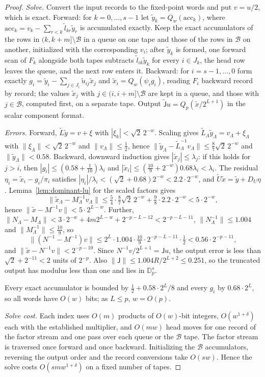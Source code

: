 \begin{proof}
\emph{Solve.} Convert the input records to the fixed-point words and put
$v=u/2$, which is exact. Forward: for $k=0,\ldots,s-1$ let
$\tilde y_k=Q_w(\mathrm{acc}_k)$, where
$\mathrm{acc}_k=v_k-\sum_{r<k}\tilde l_{kr}\tilde y_r$ is accumulated exactly.
Keep the exact accumulators of the rows in $(k,k+m]\setminus\mathcal B$ in a
queue on one tape and those of the rows in $\mathcal B$ on another, initialized
with the corresponding $v_i$; after $\tilde y_k$ is formed, one forward scan of
$F_k$ alongside both tapes subtracts $\tilde l_{ik}\tilde y_k$ for every
$i\in J_k$, the head row leaves the queue, and the next row enters it. Backward:
for $i=s-1,\ldots,0$ form exactly
$g_i=\tilde y_i-\sum_{j\in J_i}\tilde u_{ij}\tilde x_j$ and
$\tilde x_i=Q_w(\psi_ig_i)$, reading $F_i$ backward record by record; the
values $\tilde x_j$ with $j\in(i,i+m]\setminus\mathcal B$ are kept in a queue,
and those with $j\in\mathcal B$, computed first, on a separate tape. Output
$\widetilde{\mathsf J}u=Q_p(\tilde x/2^{L+1})$ in the scalar component format.

\emph{Errors.} Forward, $\widetilde L\tilde y=v+\xi$ with
$|\xi_k|<\sqrt2\,2^{-w}$. Scaling gives
$\widetilde L_\Lambda\tilde y_\Lambda=v_\Lambda+\xi_\Lambda$ with
$\|\xi_\Lambda\|<\sqrt2\,2^{-w}$ and $\|v_\Lambda\|\le\frac12$, hence
$\|\tilde y_\Lambda-\widetilde L_\Lambda^{-1}v_\Lambda\|\le\frac87\sqrt2\,2^{-w}$ and
$\|\tilde y_\Lambda\|<0.58$. Backward, downward induction gives
$|\tilde x_j|\le\lambda_j$: if this holds for $j>i$, then
$|g_i|\le(0.58+\frac1{10})\lambda_i$ and $|\tilde x_i|\le
(\frac{10}9+2^{-w})0.68\lambda_i<\lambda_i$. The residual
$\eta_i=\tilde x_i-g_i/\pi_i$ satisfies
$|\eta_i|/\lambda_i<(\sqrt2+0.68)2^{-w}<2.2\cdot2^{-w}$, and
$\widetilde U\tilde x=\tilde y+D_U\eta$. Lemma~\ref{lem:dominant-lu} for the
scaled factors gives
\[
 \|\tilde x_\Lambda-M_\Lambda^{-1}v_\Lambda\|
 \le\tfrac54\cdot\tfrac87\sqrt2\,2^{-w}+\tfrac98\cdot2.2\cdot2^{-w}<5\cdot2^{-w},
\]
hence $\|\tilde x-M^{-1}v\|<5\cdot2^{L-w}$. Further,
$\|N_\Lambda-M_\Lambda\|<3\cdot2^{-w}+4m2^{L-w}+2^{-p-L-12}<2^{-p-L-11}$,
$\|N_\Lambda^{-1}\|\le1.004$ and $\|M_\Lambda^{-1}\|\le\frac{10}9$, so
\[
 \|(N^{-1}-M^{-1})v\|\le2^L\cdot1.004\cdot\tfrac{10}9\cdot2^{-p-L-11}\cdot\tfrac12
 <0.56\cdot2^{-p-11},
\]
and $\|\tilde x-N^{-1}v\|<2^{-p-10}$. Since $N^{-1}v/2^{L+1}=\mathsf Ju$, the
output error is less than $\sqrt2+2^{-11}<2$ units of $2^{-p}$. Also
$\|\mathsf J\|\le1.004R/2^{L+2}\le0.251$, so the truncated output has modulus
less than one and lies in $\mathbb D_p^s$.

Every exact accumulator is bounded by $\frac12+0.58\cdot2^L/8$ and every $g_i$
by $0.68\cdot2^L$, so all words have $O(w)$ bits; as $L\le p$, $w=O(p)$.

\emph{Solve cost.} Each index uses $O(m)$ products of $O(w)$-bit integers,
$O(w^{1+\delta})$ each with the established multiplier, and $O(mw)$ head moves
for one record of the factor stream and one pass over each queue or the
$\mathcal B$ tape. The factor stream is traversed once forward and once
backward. Initializing the $\mathcal B$ accumulators, reversing the output
order and the record conversions take $O(sw)$. Hence the solve costs
$O(smw^{1+\delta})$ on a fixed number of tapes.
\end{proof}
